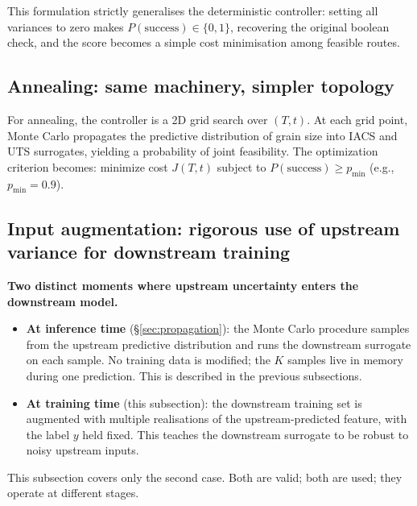 \documentclass[11pt,a4paper]{article}
\begin{document}
This formulation strictly generalises the deterministic controller: setting all variances to zero makes $P(\text{success}) \in \{0, 1\}$, recovering the original boolean check, and the score becomes a simple cost minimisation among feasible routes.

\subsection{Annealing: same machinery, simpler topology}

For annealing, the controller is a 2D grid search over $(T, t)$. At each grid point, Monte Carlo propagates the predictive distribution of grain size into IACS and UTS surrogates, yielding a probability of joint feasibility. The optimization criterion becomes: minimize cost $J(T, t)$ subject to $P(\text{success}) \geq p_{\min}$ (e.g., $p_{\min} = 0.9$).



\subsection{Input augmentation: rigorous use of upstream variance for downstream training}
\label{sec:input-aug}

\begin{recapbox}
\textbf{Two distinct moments where upstream uncertainty enters the downstream model.}
\begin{itemize}
    \item \textbf{At inference time} (§\ref{sec:propagation}): the Monte Carlo procedure samples from the upstream predictive distribution and runs the downstream surrogate on each sample. No training data is modified; the $K$ samples live in memory during one prediction. This is described in the previous subsections.
    \item \textbf{At training time} (this subsection): the downstream training set is augmented with multiple realisations of the upstream-predicted feature, with the label $y$ held fixed. This teaches the downstream surrogate to be robust to noisy upstream inputs.
\end{itemize}
This subsection covers only the second case. Both are valid; both are used; they operate at different stages.
\end{recapbox}
\end{document}
